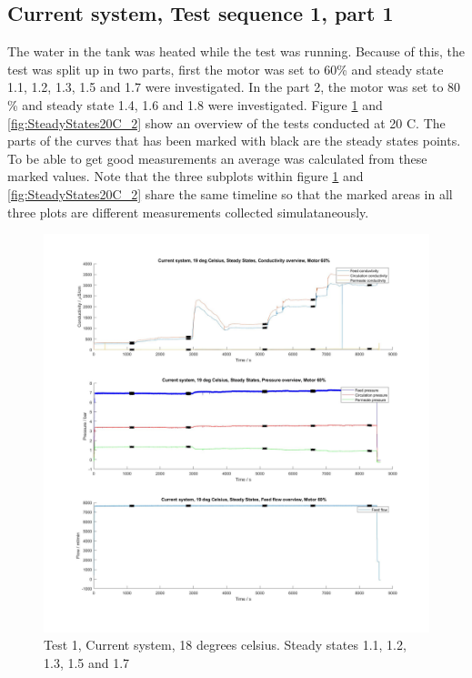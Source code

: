 \newpage

\subsection{Current system, Test sequence 1, part 1}

The water in the tank was heated while the test was running. Because of this, the test was split up in two parts, first the motor was set to 60\% and steady state 1.1, 1.2, 1.3, 1.5 and 1.7 were investigated. In the part 2, the motor was set to 80 \% and steady state 1.4, 1.6 and 1.8 were investigated. Figure \ref{fig:SteadyStates20C_1} and  \ref{fig:SteadyStates20C_2} show an overview of the tests conducted at 20 C. The parts of the curves that has been marked with black are the steady states points. To be able to get good measurements an average was calculated from these marked values. Note that the three subplots within figure  \ref{fig:SteadyStates20C_1} and  \ref{fig:SteadyStates20C_2} share the same timeline so that the marked areas in all three plots are different measurements collected simulataneously.

\begin{figure}[h]
    \centering
    \includegraphics[width=1\textwidth]{overview20_60}
    \caption{Test 1, Current system, 18 degrees celsius. Steady states 1.1, 1.2, 1.3, 1.5 and 1.7 }
    \label{fig:SteadyStates20C_1}
\end{figure}

